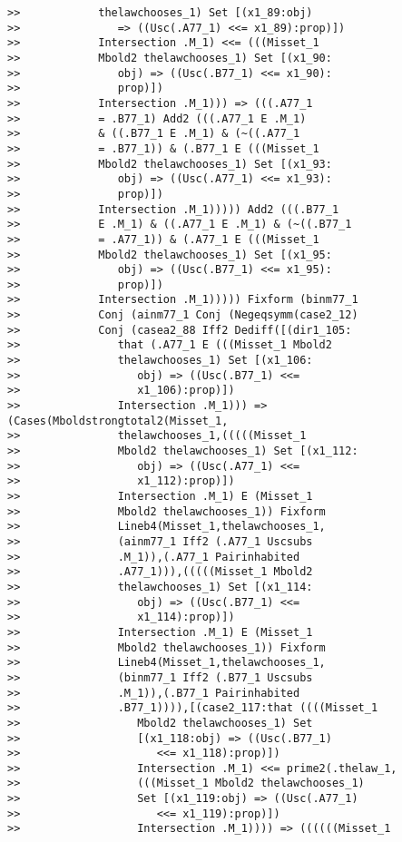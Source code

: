 \documentclass[12pt]{article}
\begin{document}
\begin{verbatim}
>>            thelawchooses_1) Set [(x1_89:obj)
>>               => ((Usc(.A77_1) <<= x1_89):prop)])
>>            Intersection .M_1) <<= (((Misset_1
>>            Mbold2 thelawchooses_1) Set [(x1_90:
>>               obj) => ((Usc(.B77_1) <<= x1_90):
>>               prop)])
>>            Intersection .M_1))) => (((.A77_1
>>            = .B77_1) Add2 (((.A77_1 E .M_1)
>>            & ((.B77_1 E .M_1) & (~((.A77_1
>>            = .B77_1)) & (.B77_1 E (((Misset_1
>>            Mbold2 thelawchooses_1) Set [(x1_93:
>>               obj) => ((Usc(.A77_1) <<= x1_93):
>>               prop)])
>>            Intersection .M_1))))) Add2 (((.B77_1
>>            E .M_1) & ((.A77_1 E .M_1) & (~((.B77_1
>>            = .A77_1)) & (.A77_1 E (((Misset_1
>>            Mbold2 thelawchooses_1) Set [(x1_95:
>>               obj) => ((Usc(.B77_1) <<= x1_95):
>>               prop)])
>>            Intersection .M_1))))) Fixform (binm77_1
>>            Conj (ainm77_1 Conj (Negeqsymm(case2_12)
>>            Conj (casea2_88 Iff2 Dediff([(dir1_105:
>>               that (.A77_1 E (((Misset_1 Mbold2
>>               thelawchooses_1) Set [(x1_106:
>>                  obj) => ((Usc(.B77_1) <<=
>>                  x1_106):prop)])
>>               Intersection .M_1))) => (Cases(Mboldstrongtotal2(Misset_1,
>>               thelawchooses_1,(((((Misset_1
>>               Mbold2 thelawchooses_1) Set [(x1_112:
>>                  obj) => ((Usc(.A77_1) <<=
>>                  x1_112):prop)])
>>               Intersection .M_1) E (Misset_1
>>               Mbold2 thelawchooses_1)) Fixform
>>               Lineb4(Misset_1,thelawchooses_1,
>>               (ainm77_1 Iff2 (.A77_1 Uscsubs
>>               .M_1)),(.A77_1 Pairinhabited
>>               .A77_1))),(((((Misset_1 Mbold2
>>               thelawchooses_1) Set [(x1_114:
>>                  obj) => ((Usc(.B77_1) <<=
>>                  x1_114):prop)])
>>               Intersection .M_1) E (Misset_1
>>               Mbold2 thelawchooses_1)) Fixform
>>               Lineb4(Misset_1,thelawchooses_1,
>>               (binm77_1 Iff2 (.B77_1 Uscsubs
>>               .M_1)),(.B77_1 Pairinhabited
>>               .B77_1)))),[(case2_117:that ((((Misset_1
>>                  Mbold2 thelawchooses_1) Set
>>                  [(x1_118:obj) => ((Usc(.B77_1)
>>                     <<= x1_118):prop)])
>>                  Intersection .M_1) <<= prime2(.thelaw_1,
>>                  (((Misset_1 Mbold2 thelawchooses_1)
>>                  Set [(x1_119:obj) => ((Usc(.A77_1)
>>                     <<= x1_119):prop)])
>>                  Intersection .M_1)))) => ((((((Misset_1

\end{verbatim}
\end{document}

